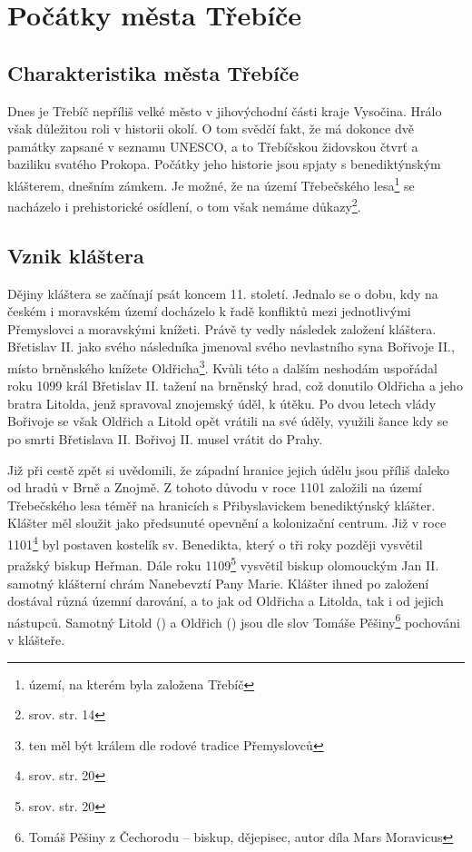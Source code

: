 \documentclass[a4paper,oneside,12pt]{report}
\begin{document}


\tableofcontents


\newpage



\setcounter{page}{1}

\chapter{Počátky města Třebíče}

\section{Charakteristika města Třebíče}

Dnes je Třebíč nepříliš velké město v jihovýchodní části kraje Vysočina.
Hrálo však důležitou roli v historii okolí.
O tom svědčí fakt, že má dokonce dvě památky zapsané v seznamu UNESCO, a to Třebíčskou židovskou čtvrť a baziliku svatého Prokopa.
Počátky jeho historie jsou spjaty s benediktýnským klášterem, dnešním zámkem.
Je možné, že na území Třebečského lesa\footnote{území, na kterém byla založena Třebíč} se nacházelo i prehistorické osídlení, o tom však nemáme důkazy\footnote{srov.  str. 14}.

\section{Vznik kláštera}

Dějiny kláštera se začínají psát koncem 11. století.
Jednalo se o dobu, kdy na českém i moravském území docházelo k řadě konfliktů mezi jednotlivými Přemyslovci a moravskými knížeti. Právě ty vedly následek založení kláštera.
Břetislav II. jako svého následníka jmenoval svého nevlastního syna Bořivoje II., místo brněnského knížete Oldřicha\footnote{ten měl být králem dle rodové tradice Přemyslovců}.
Kvůli této a dalším neshodám uspořádal roku 1099 král Břetislav II. tažení na brněnský hrad, což donutilo Oldřicha a jeho bratra Litolda, jenž spravoval znojemský úděl, k útěku.
Po dvou letech vlády Bořivoje se však Oldřich a Litold opět vrátili na své úděly, využili šance kdy se po smrti Břetislava II. Bořivoj II. musel vrátit do Prahy.

Již při cestě zpět si uvědomili, že západní hranice jejich údělu jsou příliš daleko od hradů v Brně a Znojmě.
Z tohoto důvodu v roce 1101 založili na území Třebečského lesa téměř na hranicích s Přibyslavickem benediktýnský klášter.
Klášter měl sloužit jako předsunuté opevnění a kolonizační centrum.
Již v roce 1101\footnote{srov. \cite{Uhlir1978} str. 20} byl postaven kostelík sv. Benedikta, který o tři roky později vysvětil pražský biskup Heřman.
Dále roku 1109\footnote{srov. \cite{Uhlir1978} str. 20} vysvětil biskup olomouckým Jan II. samotný klášterní chrám Nanebevztí Pany Marie.
Klášter ihned po založení dostával různá územní darování, a to jak od Oldřicha a Litolda, tak i od jejich nástupců.
Samotný Litold () a Oldřich () jsou dle slov Tomáše Pěšiny\footnote{Tomáš Pěšiny z Čechorodu -- biskup, dějepisec, autor díla Mars Moravicus} pochováni v klášteře.
\end{document}
